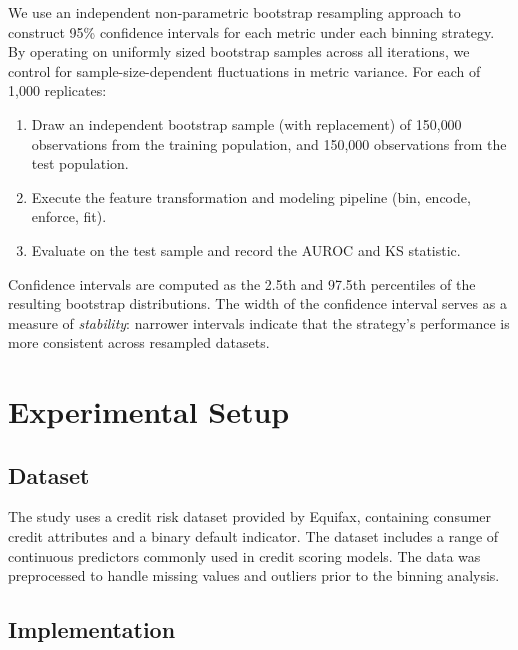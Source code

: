 \documentclass[11pt]{article}
\begin{document}
We use an independent non-parametric bootstrap resampling approach \citep{efron1979bootstrap, efron1994introduction} to construct 95\% confidence intervals for each metric under each binning strategy. By operating on uniformly sized bootstrap samples across all iterations, we control for sample-size-dependent fluctuations in metric variance. For each of 1{,}000 replicates:
\begin{enumerate}[nosep]
    \item Draw an independent bootstrap sample (with replacement) of 150{,}000 observations from the training population, and 150{,}000 observations from the test population.
    \item Execute the feature transformation and modeling pipeline (bin, encode, enforce, fit).
    \item Evaluate on the test sample and record the AUROC and KS statistic.
\end{enumerate}

Confidence intervals are computed as the 2.5th and 97.5th percentiles of the resulting bootstrap distributions. The width of the confidence interval serves as a measure of \emph{stability}: narrower intervals indicate that the strategy's performance is more consistent across resampled datasets.


\section{Experimental Setup}
\label{sec:setup}

\subsection{Dataset}

The study uses a credit risk dataset provided by Equifax, containing consumer credit attributes and a binary default indicator. The dataset includes a range of continuous predictors commonly used in credit scoring models. The data was preprocessed to handle missing values and outliers prior to the binning analysis.

\subsection{Implementation}
\end{document}
